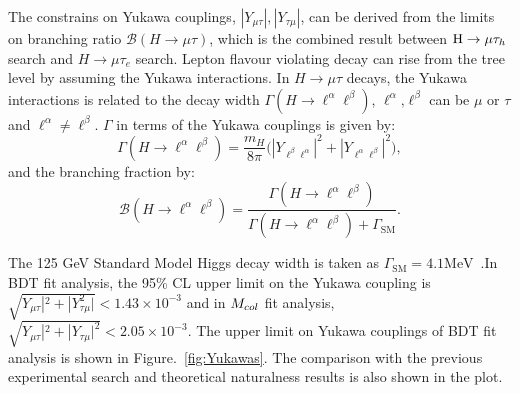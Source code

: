 The constrains on Yukawa couplings, $|Y_{\mu\tau}|, |Y_{\tau\mu}|$, can be derived from the limits on branching ratio $\mathcal{B}(H \to \mu \tau)$, which is the combined result between $\mathrm{H}\to \mu\tau_{h}$ search and $H \to \mu\tau_{e}$ search. Lepton flavour violating decay can rise from the tree level by assuming the Yukawa interactions. In $H \to \mu \tau$ decays, the Yukawa interactions is related to the decay width  $\Gamma(H \to \ell^{\alpha}\ell^{\beta})$,  $\ell^{\alpha}\textrm{,}\ell^{\beta}$ can be $\mu$ or $\tau$ and $\ell^{\alpha} \neq \ell^{\beta}$. $\Gamma$ in terms of the Yukawa couplings is given by:
\begin{equation}  
\Gamma(H \to \ell^{\alpha}\ell^{\beta})=\frac{m_{H}}{8\pi}\bigl(|Y_{\ell^{\beta}\ell^{\alpha}}|^2 + |Y_{\ell^{\alpha}\ell^{\beta}}|^2\bigr),\label{eq:Yukawa}
\end{equation}
and the branching fraction by:
\begin{equation}
\mathcal{B}(H \to \ell^{\alpha}\ell^{\beta})=\frac{\Gamma(H\to \ell^{\alpha}\ell^{\beta})}{\Gamma(H\to \ell^{\alpha}\ell^{\beta}) + \Gamma_{\mathrm{SM}}}. \label{eq:Branchingfraction}
\end{equation}

The 125 GeV Standard Model Higgs  decay width is taken as $\Gamma_{\mathrm{SM}}=4.1\textrm{MeV}$~\cite{Denner:2011mq}.In BDT fit analysis, the 95\% CL upper limit on the Yukawa coupling is $\sqrt{Y_{\mu\tau}|^2 + |Y_{\tau\mu}^2|}<1.43\times 10^{-3}$ and in $M_{col}$ fit analysis, $\sqrt{Y_{\mu\tau}|^2 + |Y_{\tau\mu}|^2}<2.05\times 10^{-3}$. The upper limit on Yukawa couplings of BDT fit analysis is shown in Figure.~\ref{fig:Yukawas}. The comparison with the previous experimental search and theoretical naturalness results is also shown in the plot. 





